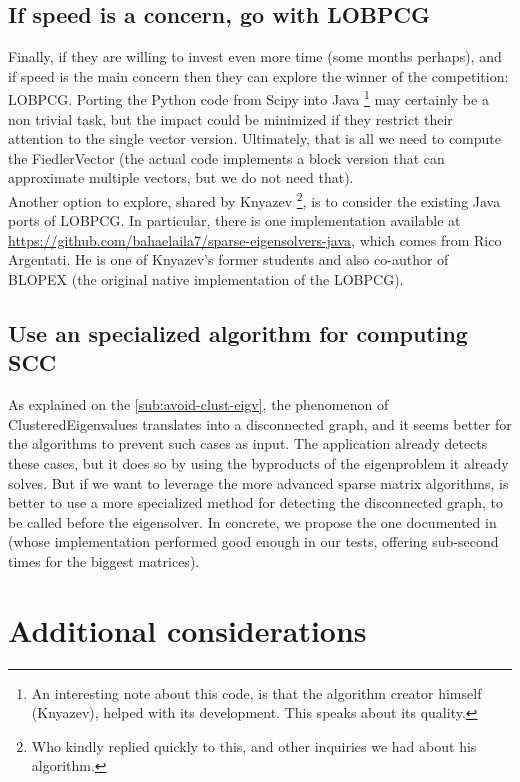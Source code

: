 \subsection{If speed is a concern, go with \gls{LOBPCG}}

Finally, if they are willing to invest even more time (some months
perhaps),  and if speed is the
main concern then they can explore the winner of the competition:
\gls{LOBPCG}. Porting the Python code from Scipy into Java \footnote{An
  interesting note about this code, is that the algorithm creator
  himself (Knyazev), helped with its development. This speaks about
  its quality.} may certainly be a non trivial task, but the impact
could be minimized if they restrict their attention to the single
vector version. Ultimately, that is all we need to compute the \gls{FiedlerVector} (the 
actual code implements a block version that can approximate multiple
vectors, but we do not need that). \\

Another option to explore, shared by Knyazev \footnote{Who kindly
  replied quickly to this, and other inquiries we had about his
  algorithm.}, is to consider the existing Java ports of
\gls{LOBPCG}. In particular, there is one implementation
available at
\url{https://github.com/bahaelaila7/sparse-eigensolvers-java}, which
comes from Rico Argentati. He is one of Knyazev's former students and also
co-author of BLOPEX \cite{blopex} (the original native
implementation of the \gls{LOBPCG}).

\subsection{Use an specialized algorithm for computing SCC}

As explained on the \cref{sub:avoid-clust-eigv}, the phenomenon of
\gls{ClusteredEigenvalues} translates into a disconnected graph, and
it seems better for the algorithms to prevent such cases as input. The
application already detects these cases, but it does so by using the
byproducts of the eigenproblem it already solves. But if we want to
leverage the more advanced sparse matrix algorithms, is better to use
a more specialized method for detecting the disconnected graph, to
be called before the eigensolver. In
concrete, we propose the one documented in \cite{pearce05} (whose
implementation performed good enough in our tests, offering sub-second
times for the biggest matrices). 

\section{Additional considerations}

